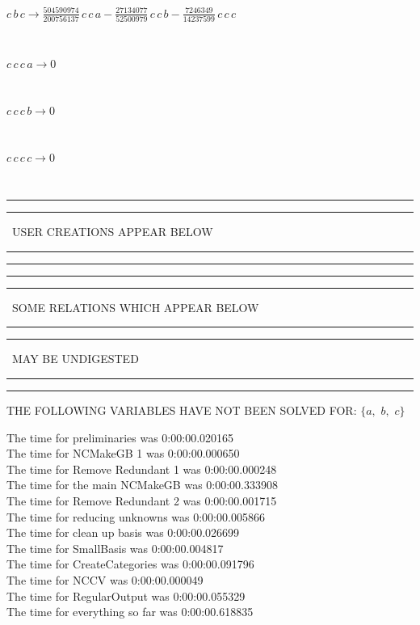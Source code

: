 \documentclass[rep10,leqno]{report}
\begin{document}
\begin{minipage}{6in}
$
c\,
 b\,
 c\rightarrow \frac{504590974}{200756137}\,
 c\,
 c\,
 a - \frac{27134077}{52500979}\,
 c\,
 c\,
 b - \frac{7246349}{14237599}\,
 c\,
 c\,
 c
$
\end{minipage}\medskip \\
\begin{minipage}{6in}
$
c\,
 c\,
 c\,
 a\rightarrow 0
$
\end{minipage}\medskip \\
\begin{minipage}{6in}
$
c\,
 c\,
 c\,
 b\rightarrow 0
$
\end{minipage}\medskip \\
\begin{minipage}{6in}
$
c\,
 c\,
 c\,
 c\rightarrow 0
$
\end{minipage}\\
\rule[2pt]{6in}{1pt}\hfil\break
\rule[2.5pt]{1.701in}{1pt}
\ USER CREATIONS APPEAR BELOW\ 
\rule[2.5pt]{1.701in}{1pt}\hfil\break
\rule[2pt]{6in}{1pt}\hfil\break
\rule[2pt]{6in}{4pt}\hfil\break
\rule[2pt]{1.45in}{4pt}
\ SOME RELATIONS WHICH APPEAR BELOW\ 
\rule[2pt]{1.45in}{4pt}\hfil\break
\rule[2pt]{2.18in}{4pt}
\ MAY BE UNDIGESTED\ 
\rule[2pt]{2.18in}{4pt}\hfil\break
\rule[2pt]{6in}{4pt}\hfil\break
THE FOLLOWING VARIABLES HAVE NOT BEEN SOLVED FOR:\hfil\break
$\{a,
$ $
b,
$ $
c\}$
\smallskip\\
\vspace{10pt}

\noindent
The time for preliminaries was 0:00:00.020165\\
The time for NCMakeGB 1 was 0:00:00.000650\\
The time for Remove Redundant 1 was 0:00:00.000248\\
The time for the main NCMakeGB was 0:00:00.333908\\
The time for Remove Redundant 2 was 0:00:00.001715\\
The time for reducing unknowns was 0:00:00.005866\\
The time for clean up basis was 0:00:00.026699\\
The time for SmallBasis was 0:00:00.004817\\
The time for CreateCategories was 0:00:00.091796\\
The time for NCCV was 0:00:00.000049\\
The time for RegularOutput was 0:00:00.055329\\
The time for everything so far was 0:00:00.618835\\
\end{document}
